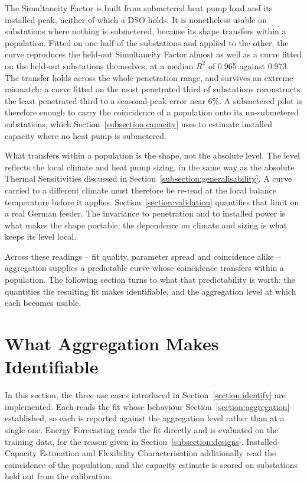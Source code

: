 \documentclass[9pt,journal,a4]{IEEEtran}
\begin{document}
The Simultaneity Factor is built from submetered heat pump load and its installed peak, neither of which a DSO holds. It is nonetheless usable on substations where nothing is submetered, because its shape transfers within a population. Fitted on one half of the substations and applied to the other, the curve reproduces the held-out Simultaneity Factor almost as well as a curve fitted on the held-out substations themselves, at a median $R^2$ of 0.965 against 0.973. The transfer holds across the whole penetration range, and survives an extreme mismatch: a curve fitted on the most penetrated third of substations reconstructs the least penetrated third to a seasonal-peak error near 6\%. A submetered pilot is therefore enough to carry the coincidence of a population onto its un-submetered substations, which Section~\ref{subsection:capacity} uses to estimate installed capacity where no heat pump is submetered.

What transfers within a population is the shape, not the absolute level. The level reflects the local climate and heat pump sizing, in the same way as the absolute Thermal Sensitivities discussed in Section~\ref{subsection:generalisability}. A curve carried to a different climate must therefore be re-read at the local balance temperature before it applies. Section~\ref{section:validation} quantifies that limit on a real German feeder. The invariance to penetration and to installed power is what makes the shape portable; the dependence on climate and sizing is what keeps its level local.

Across these readings -- fit quality, parameter spread and coincidence alike -- aggregation supplies a predictable curve whose coincidence transfers within a population. The following section turns to what that predictability is worth: the quantities the resulting fit makes identifiable, and the aggregation level at which each becomes usable.


\section{What Aggregation Makes Identifiable}
\label{section:usecases}
In this section, the three use cases introduced in Section~\ref{section:identify} are implemented. Each reads the fit whose behaviour Section~\ref{section:aggregation} established, so each is reported against the aggregation level rather than at a single one. Energy Forecasting reads the fit directly and is evaluated on the training data, for the reason given in Section~\ref{subsection:designs}. Installed-Capacity Estimation and Flexibility Characterisation additionally read the coincidence of the population, and the capacity estimate is scored on substations held out from the calibration.
\end{document}
